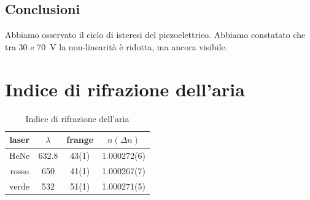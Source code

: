 \documentclass[a4paper]{article}
\begin{document}
\subsection{Conclusioni}
Abbiamo osservato il ciclo di isteresi del piezoelettrico. Abbiamo constatato che tra 30 e 70~V la non-linearità è ridotta, ma ancora visibile. 

\section{Indice di rifrazione dell'aria}

\begin{table}[H]
	\centering
	\begin{tabular}{|c|c|c|c|}
		\hline
		laser & $\lambda$ & frange  & $n(\Delta n)$ \\
		\hline
		HeNe & 632.8 & 43(1) &1.000272(6)\\
		rosso & 650 & 41(1) &1.000267(7)\\ 
		verde & 532 & 51(1) &1.000271(5)\\
		\hline
	\end{tabular}
	\caption{Indice di rifrazione dell'aria}
	\label{tab:n}
\end{table}
\end{document}
